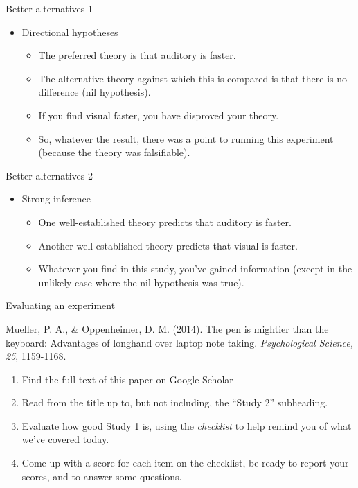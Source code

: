 \documentclass{beamer}
\begin{document}
\begin{frame}{Better alternatives 1}
\begin{itemize}
\item Directional hypotheses
\begin{itemize}
\item The preferred theory is that auditory is faster.
\item The alternative theory against which this is compared is that there is no difference (nil hypothesis).
\item If you find visual faster, you have disproved your theory.
\item So, whatever the result, there was a point to running this experiment (because the theory was falsifiable).
\end{itemize}
\end{itemize}
\end{frame}

\begin{frame}{Better alternatives 2}
\begin{itemize}
\item Strong inference
\begin{itemize}
\item One well-established theory predicts that auditory is faster.
\item Another well-established theory predicts that visual is faster.
\item Whatever you find in this study, you've gained information (except in the unlikely case where the nil hypothesis was true).
\end{itemize}
\end{itemize}
\end{frame}

\begin{frame}{Evaluating an experiment}

  Mueller, P. A., \& Oppenheimer, D. M. (2014). The pen is mightier than the keyboard: Advantages of longhand over laptop note taking. \emph{Psychological Science, 25}, 1159-1168.

  \vspace{12pt}
  
\begin{enumerate}
\item Find the full text of this paper on Google Scholar
\item Read from the title up to, but not including, the ``Study 2'' subheading.
\item Evaluate how good Study 1 is, using the \emph{checklist} to help remind you of what we've covered today.
\item Come up with a score for each item on the checklist, be ready to report your scores, and to answer some questions.
\end{enumerate}
\end{frame}
\end{document}

